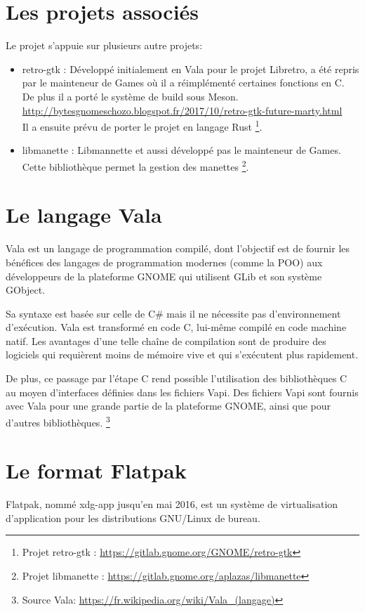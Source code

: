 \documentclass[12pt]{report}
\begin{document}
\section{Les projets associés}
Le projet s'appuie sur plusieurs autre projets:
\begin{itemize}
\item retro-gtk : Développé initialement en Vala pour le projet Libretro, a
  été repris par le mainteneur de Games où il a réimplémenté certaines
  fonctions en C. De plus il a porté le système de build sous Meson.\\
  \url{http://bytesgnomeschozo.blogspot.fr/2017/10/retro-gtk-future-marty.html}\\
  Il a ensuite prévu de porter le projet en langage Rust
  \footnote{Projet retro-gtk : \url{https://gitlab.gnome.org/GNOME/retro-gtk}}.
\item libmanette : Libmannette et aussi développé pas le mainteneur de Games. Cette bibliothèque
  permet la gestion des manettes
  \footnote{Projet libmanette : \url{https://gitlab.gnome.org/aplazas/libmanette}}.
\end{itemize}

\section{Le langage Vala}
Vala est un langage de programmation compilé, dont l'objectif est de
fournir les bénéfices des langages de programmation modernes (comme la
POO) aux développeurs de la plateforme GNOME qui utilisent GLib et son
système GObject.

Sa syntaxe est basée sur celle de C\# mais il ne nécessite pas
d'environnement d'exécution. Vala est transformé en code C, lui-même
compilé en code machine natif. Les avantages d'une telle chaîne de
compilation sont de produire des logiciels qui requièrent moins de
mémoire vive et qui s'exécutent plus rapidement.

De plus, ce passage par l'étape C rend possible l'utilisation des
bibliothèques C au moyen d'interfaces définies dans les fichiers
Vapi. Des fichiers Vapi sont fournis avec Vala pour une grande partie
de la plateforme GNOME, ainsi que pour d'autres bibliothèques.
\footnote{Source Vala: \url{https://fr.wikipedia.org/wiki/Vala_(langage)}}

\section{Le format Flatpak}
Flatpak, nommé xdg-app jusqu’en mai 2016, est un système de
virtualisation d’application pour les distributions GNU/Linux de
bureau.
\end{document}
